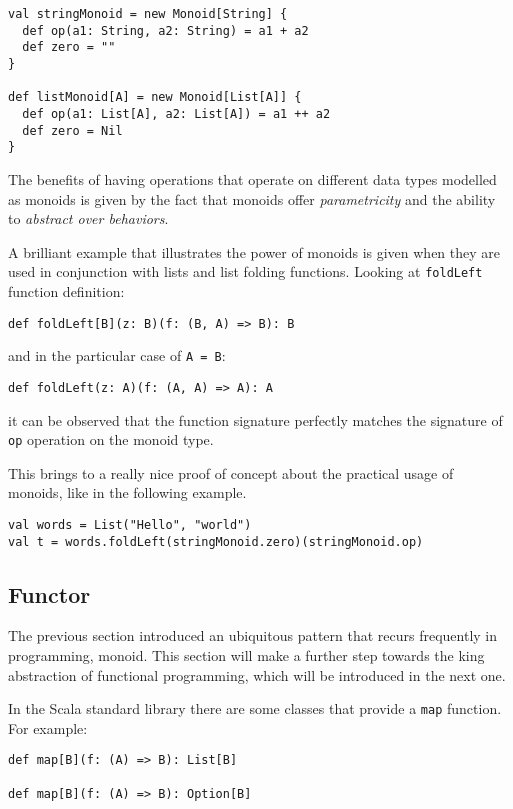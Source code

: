 \begin{verbatim}
val stringMonoid = new Monoid[String] {
  def op(a1: String, a2: String) = a1 + a2
  def zero = ""
}

def listMonoid[A] = new Monoid[List[A]] {
  def op(a1: List[A], a2: List[A]) = a1 ++ a2
  def zero = Nil
}
\end{verbatim}

The benefits of having operations that operate on different data types
modelled as monoids is given by the fact that monoids offer
\emph{parametricity} and the ability to \emph{abstract over behaviors}.

A brilliant example that illustrates the power of monoids is given when
they are used in conjunction with lists and list folding functions.
Looking at \texttt{foldLeft} function definition:

\begin{verbatim}
def foldLeft[B](z: B)(f: (B, A) => B): B
\end{verbatim}

and in the particular case of \texttt{A\ =\ B}:

\begin{verbatim}
def foldLeft(z: A)(f: (A, A) => A): A
\end{verbatim}

it can be observed that the function signature perfectly matches the
signature of \texttt{op} operation on the monoid type.

This brings to a really nice proof of concept about the practical usage
of monoids, like in the following example.

\begin{verbatim}
val words = List("Hello", "world")
val t = words.foldLeft(stringMonoid.zero)(stringMonoid.op)
\end{verbatim}

\subsection{Functor}\label{functor}

The previous section introduced an ubiquitous pattern that recurs
frequently in programming, monoid. This section will make a further step
towards the king abstraction of functional programming, which will be
introduced in the next one.

In the Scala standard library there are some classes that provide a
\texttt{map} function. For example:

\begin{verbatim}
def map[B](f: (A) => B): List[B]

def map[B](f: (A) => B): Option[B]
\end{verbatim}

